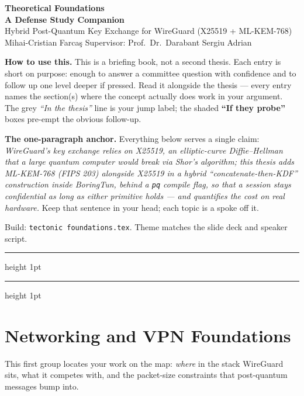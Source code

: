\documentclass[11pt]{article}
\begin{document}
\begin{center}
  {\LARGE\bfseries\color{deepcyan}Theoretical Foundations}\\[3pt]
  {\large\bfseries\color{deepcyan}A Defense Study Companion}\\[8pt]
  {\large Hybrid Post-Quantum Key Exchange for WireGuard (X25519 + ML-KEM-768)}\\[6pt]
  {\normalsize Mihai-Cristian Farca\c{s} \quad\textbar\quad Supervisor: Prof.\ Dr.\ Darabant Sergiu Adrian}
\end{center}

\vspace{0.6em}
\noindent\textbf{How to use this.} This is a briefing book, not a second thesis.
Each entry is short on purpose: enough to answer a committee question with
confidence and to follow up one level deeper if pressed. Read it alongside the
thesis --- every entry names the section(s) where the concept actually does work
in your argument. The grey \textit{``In the thesis''} line is your jump label;
the shaded \textbf{``If they probe''} boxes pre-empt the obvious follow-up.

\vspace{0.4em}
\noindent\textbf{The one-paragraph anchor.} Everything below serves a single
claim: \emph{WireGuard's key exchange relies on X25519, an elliptic-curve
Diffie--Hellman that a large quantum computer would break via Shor's algorithm;
this thesis adds ML-KEM-768 (FIPS 203) alongside X25519 in a hybrid
``concatenate-then-KDF'' construction inside BoringTun, behind a \texttt{pq}
compile flag, so that a session stays confidential as long as \emph{either}
primitive holds --- and quantifies the cost on real hardware.} Keep that
sentence in your head; each topic is a spoke off it.

\vspace{0.4em}
{\small\color{softgray}\noindent Build: \texttt{tectonic foundations.tex}. Theme matches the slide deck and speaker script.}

\vspace{0.8em}
\hrule height 1pt
\tableofcontents
\vspace{0.6em}
\hrule height 1pt

\section{Networking and VPN Foundations}
This first group locates your work on the map: \emph{where} in the stack
WireGuard sits, what it competes with, and the packet-size constraints that
post-quantum messages bump into.
\end{document}
